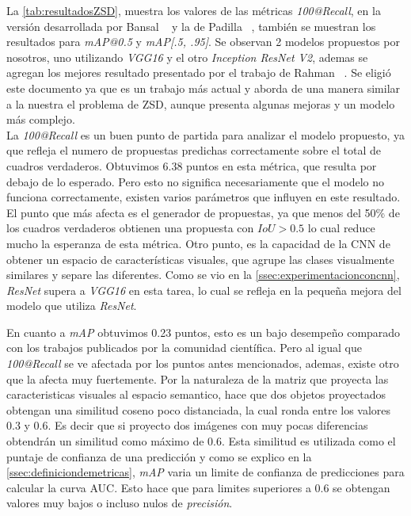 La \autoref{tab:resultadosZSD}, muestra los valores de las métricas \textit{100@Recall}, en la versión desarrollada por Bansal \etal~\cite{bansal2018zero} y la de Padilla \etal~\cite{padilla2020survey}, también se muestran los resultados para \textit{mAP@0.5} y \textit{mAP[.5, .95]}. Se observan 2 modelos propuestos por nosotros, uno utilizando \textit{VGG16} y el otro \textit{Inception ResNet V2}, ademas se agregan los mejores resultado presentado por el trabajo de Rahman \etal~\cite{rahman2020zero}. Se eligió este documento ya que es un trabajo más actual y aborda de una manera similar a la nuestra el problema de ZSD, aunque presenta algunas mejoras y un modelo más complejo.\\

La \textit{100@Recall} es un buen punto de partida para analizar el modelo propuesto, ya que refleja el numero de propuestas predichas correctamente sobre el total de cuadros verdaderos. Obtuvimos 6.38 puntos en esta métrica, que resulta por debajo de lo esperado. Pero esto no significa necesariamente que el modelo no funciona correctamente, existen varios parámetros que influyen en este resultado. El punto que más afecta es el generador de propuestas, ya que menos del 50\% de los cuadros verdaderos obtienen una propuesta con $IoU > 0.5$ lo cual reduce mucho la esperanza de esta métrica. Otro punto, es la capacidad de la CNN de obtener un espacio de características visuales, que agrupe las clases visualmente similares y separe las diferentes. Como se vio en la \autoref{ssec:experimentacionconcnn}, \textit{ResNet} supera a \textit{VGG16} en esta tarea, lo cual se refleja en la pequeña mejora del modelo que utiliza  \textit{ResNet}.

En cuanto a \textit{mAP} obtuvimos 0.23 puntos, esto es un bajo desempeño comparado con los trabajos publicados por la comunidad científica. Pero al igual que \textit{100@Recall} se ve afectada por los puntos antes mencionados, ademas, existe otro que la afecta muy fuertemente. Por la naturaleza de la matriz que proyecta las caracteristicas visuales al espacio semantico, hace que dos objetos proyectados obtengan una similitud coseno poco distanciada, la cual ronda entre los valores 0.3 y 0.6. Es decir que si proyecto dos imágenes con muy pocas diferencias obtendrán un similitud como máximo de 0.6. Esta similitud es utilizada como el puntaje de confianza de una predicción y como se explico en la \autoref{ssec:definiciondemetricas}, \textit{mAP} varia un limite de confianza de predicciones para calcular la curva AUC. Esto hace que para limites superiores a 0.6 se obtengan valores muy bajos o incluso nulos de \textit{precisión}.\\
 

